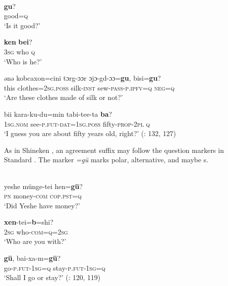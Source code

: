 \ea%
    \label{ex:mong:13}
    \\
    \ea
    \textbf{{gu}}?\\
    good=\textsc{q}\\
    \glt ‘Is it good?’
    
    \ex
     \textbf{{ken}} \textbf{{bei}}?\\
    3\textsc{sg}  who  \textsc{q}\\
    \glt ‘Who is he?’ \citep[97]{Janhunen2003c}
    
    \ex
    \gll ənə  kobcaxon=cini  tɔrg-ɔɔr  ɔjɔ-gd-ɔɔ=\textbf{{gu}}, {bisi=}\textbf{{gu}}?\\
    this  clothes=2\textsc{sg.poss}  silk-\textsc{inst}  sew-\textsc{pass}-\textsc{p.ipfv}=\textsc{q} \textsc{neg}=\textsc{q}\\
    \glt ‘Are these clothes made of silk or not?’\glt
    
    \ex
    \gll bii    kara-ku-du=min    tabi-tee-ta \textbf{{ba}}?\\
    1\textsc{sg.nom}  see-\textsc{p.fut}-\textsc{dat}=1\textsc{sg.poss}  fifty-\textsc{prop}-2\textsc{pl}  \textsc{q}\\
    \glt ‘I guess you are about fifty years old, right?’ (\citealt{Yamakoshi2007a}: 132, 127)\z\z

As in Shineken , an agreement suffix may follow the question markers in Standard . The marker \textit{=gü} marks polar, alternative, and maybe s.

\ea%
    \label{ex:mong:14}
    \\
    \ea
    \gll yeshe  münge-tei  hen=\textbf{{gü}}?\\
    \textsc{pn}  money-\textsc{com}  \textsc{cop.pst}=\textsc{q}\\
    \glt ‘Did Yeshe have money?’
    
    \ex
     \textbf{{xen}}{-tei}{=}\textbf{{b}}{=shi}?\\
    2\textsc{sg}  who-\textsc{com}=\textsc{q}=2\textsc{sg}\\
    \glt ‘Who are you with?’
    
    \ex
    \textbf{{gü}},  bai-xa-m=\textbf{{gü}}?\\
    go-\textsc{p}.\textsc{fut}-1\textsc{sg}=\textsc{q}  stay-\textsc{p}.\textsc{fut}-1\textsc{sg}=\textsc{q}\\
    \glt ‘Shall I go or stay?’ (\citealt{Skribnik2003}: 120, 119)
    \z
    \z 

